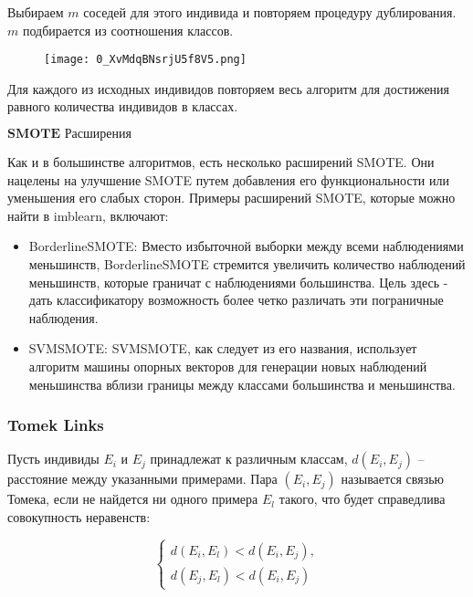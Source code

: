 \documentclass{article}
\begin{document}
	Выбираем $m$ соседей для этого индивида и повторяем процедуру дублирования. $m$ подбирается из соотношения классов. 
	
	\begin{figure}[h!]
		\begin{center}
			\texttt{[image: 0\_XvMdqBNsrjU5f8V5.png]}
		\end{center}
		\vspace{-5mm}
	\end{figure}

	Для каждого из исходных индивидов повторяем весь алгоритм для достижения равного количества индивидов в классах.
	
	$\textbf{SMOTE Расширения}$
	
	Как и в большинстве алгоритмов, есть несколько расширений SMOTE. Они нацелены на улучшение SMOTE путем добавления его функциональности или уменьшения его слабых сторон. Примеры расширений SMOTE, которые можно найти в imblearn, включают:
	
	\begin{itemize}
		\item BorderlineSMOTE: Вместо избыточной выборки между всеми наблюдениями меньшинств, BorderlineSMOTE стремится увеличить количество наблюдений меньшинств, которые граничат с наблюдениями большинства. Цель здесь - дать классификатору возможность более четко различать эти пограничные наблюдения.
		\item SVMSMOTE: SVMSMOTE, как следует из его названия, использует алгоритм машины опорных векторов для генерации новых наблюдений меньшинства вблизи границы между классами большинства и меньшинства.
	\end{itemize}
	
	\subsubsection{Tomek Links}
	
	Пусть индивиды $E_i$ и $E_j$ принадлежат к различным классам, $d(E_i,E_j)$
	– расстояние между указанными примерами. Пара $(E_i,E_j)$
	называется связью Томека, если не найдется ни одного примера $E_l$
	такого, что будет справедлива совокупность неравенств:
	
	\begin{equation*}
		\begin{cases}
			d(E_i,E_l)<d(E_i,E_j),\\
			d(E_j,E_l)<d(E_i,E_j)
		\end{cases}
	\end{equation*}
	
\end{document}
